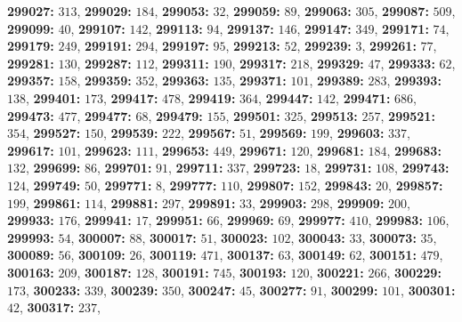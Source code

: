 \textsf{\bfseries 299027:} $313$, \textsf{\bfseries 299029:} $184$, \textsf{\bfseries 299053:} $32$, \textsf{\bfseries 299059:} $89$, \textsf{\bfseries 299063:} $305$, \textsf{\bfseries 299087:} $509$, \textsf{\bfseries 299099:} $40$, \textsf{\bfseries 299107:} $142$, \textsf{\bfseries 299113:} $94$, \textsf{\bfseries 299137:} $146$, \textsf{\bfseries 299147:} $349$, \textsf{\bfseries 299171:} $74$, \textsf{\bfseries 299179:} $249$, \textsf{\bfseries 299191:} $294$, \textsf{\bfseries 299197:} $95$, \textsf{\bfseries 299213:} $52$, \textsf{\bfseries 299239:} $3$, \textsf{\bfseries 299261:} $77$, \textsf{\bfseries 299281:} $130$, \textsf{\bfseries 299287:} $112$, \textsf{\bfseries 299311:} $190$, \textsf{\bfseries 299317:} $218$, \textsf{\bfseries 299329:} $47$, \textsf{\bfseries 299333:} $62$, \textsf{\bfseries 299357:} $158$, \textsf{\bfseries 299359:} $352$, \textsf{\bfseries 299363:} $135$, \textsf{\bfseries 299371:} $101$, \textsf{\bfseries 299389:} $283$, \textsf{\bfseries 299393:} $138$, \textsf{\bfseries 299401:} $173$, \textsf{\bfseries 299417:} $478$, \textsf{\bfseries 299419:} $364$, \textsf{\bfseries 299447:} $142$, \textsf{\bfseries 299471:} $686$, \textsf{\bfseries 299473:} $477$, \textsf{\bfseries 299477:} $68$, \textsf{\bfseries 299479:} $155$, \textsf{\bfseries 299501:} $325$, \textsf{\bfseries 299513:} $257$, \textsf{\bfseries 299521:} $354$, \textsf{\bfseries 299527:} $150$, \textsf{\bfseries 299539:} $222$, \textsf{\bfseries 299567:} $51$, \textsf{\bfseries 299569:} $199$, \textsf{\bfseries 299603:} $337$, \textsf{\bfseries 299617:} $101$, \textsf{\bfseries 299623:} $111$, \textsf{\bfseries 299653:} $449$, \textsf{\bfseries 299671:} $120$, \textsf{\bfseries 299681:} $184$, \textsf{\bfseries 299683:} $132$, \textsf{\bfseries 299699:} $86$, \textsf{\bfseries 299701:} $91$, \textsf{\bfseries 299711:} $337$, \textsf{\bfseries 299723:} $18$, \textsf{\bfseries 299731:} $108$, \textsf{\bfseries 299743:} $124$, \textsf{\bfseries 299749:} $50$, \textsf{\bfseries 299771:} $8$, \textsf{\bfseries 299777:} $110$, \textsf{\bfseries 299807:} $152$, \textsf{\bfseries 299843:} $20$, \textsf{\bfseries 299857:} $199$, \textsf{\bfseries 299861:} $114$, \textsf{\bfseries 299881:} $297$, \textsf{\bfseries 299891:} $33$, \textsf{\bfseries 299903:} $298$, \textsf{\bfseries 299909:} $200$, \textsf{\bfseries 299933:} $176$, \textsf{\bfseries 299941:} $17$, \textsf{\bfseries 299951:} $66$, \textsf{\bfseries 299969:} $69$, \textsf{\bfseries 299977:} $410$, \textsf{\bfseries 299983:} $106$, \textsf{\bfseries 299993:} $54$, \textsf{\bfseries 300007:} $88$, \textsf{\bfseries 300017:} $51$, \textsf{\bfseries 300023:} $102$, \textsf{\bfseries 300043:} $33$, \textsf{\bfseries 300073:} $35$, \textsf{\bfseries 300089:} $56$, \textsf{\bfseries 300109:} $26$, \textsf{\bfseries 300119:} $471$, \textsf{\bfseries 300137:} $63$, \textsf{\bfseries 300149:} $62$, \textsf{\bfseries 300151:} $479$, \textsf{\bfseries 300163:} $209$, \textsf{\bfseries 300187:} $128$, \textsf{\bfseries 300191:} $745$, \textsf{\bfseries 300193:} $120$, \textsf{\bfseries 300221:} $266$, \textsf{\bfseries 300229:} $173$, \textsf{\bfseries 300233:} $339$, \textsf{\bfseries 300239:} $350$, \textsf{\bfseries 300247:} $45$, \textsf{\bfseries 300277:} $91$, \textsf{\bfseries 300299:} $101$, \textsf{\bfseries 300301:} $42$, \textsf{\bfseries 300317:} $237$, 
